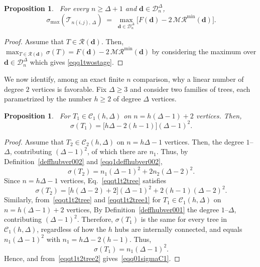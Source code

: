 \documentclass[12pt]{amsart}
\newtheorem{proposition}[theorem]{Proposition}
\newcommand{\TT}{\mathcal{T}}
\newcommand{\RR}{\mathcal{MR}}
\begin{document}
\begin{proposition}~\label{prop01decomposition}
For every $n\geqslant \Delta+1$ and $\mathbf d\in\mathcal D_n^\Delta$,
\begin{equation}~\label{eqq1twostage}
\sigma_{\max}(\TT_{n(i,j),\,\Delta}) \;=\; \max_{\mathbf d\in\mathcal D_n^\Delta}
\Big[F(\mathbf d) - 2\,\RR^{\min}(\mathbf d)\Big].
\end{equation}
\end{proposition}
\begin{proof}
Assume that $T\in\mathcal R(\mathbf d)$. Then, 
$\max_{T\in\mathcal R(\mathbf d)}\sigma(T) = F(\mathbf d) - 2\, \RR^{\min}(\mathbf d)$ by considering the maximum over $\mathbf d\in\mathcal D_n^\Delta$ which gives \eqref{eqq1twostage}.
\end{proof}

We now identify, among an exact finite $n$ comparison, why a linear number of
degree $2$ vertices is favorable. Fix $\Delta\geqslant 3$ and consider two families
of trees, each parametrized by the number $h\geqslant 2$ of degree $\Delta$ 
vertices.



\begin{proposition}~\label{prop001C1sigma}
For $T_1\in\mathcal C_1(h,\Delta)$ on $n=h(\Delta-1)+2$ vertices. Then, 
\begin{equation}~\label{eqq01sigmaC1}
\sigma(T_1)=\big[h\Delta-2(h-1)\big](\Delta-1)^2.
\end{equation}
\end{proposition}
\begin{proof}
Assume that $T_2\in\mathcal C_2(h,\Delta)$ on $n=h\Delta-1$ vertices. Then, the degree $1$–$\Delta$, contributing $(\Delta-1)^2$, of which there are $n_1$.  Thus, by Definition~\ref{deffhubver002} and \eqref{eqq1deffhubver002}, 
\begin{equation}~\label{eqqt1t2tree}
\sigma(T_2)=n_1(\Delta-1)^2 + 2n_2(\Delta-2)^2.
\end{equation}
Since $n=h\Delta-1$ vertices, Eq.~\eqref{eqqt1t2tree} satisfies
\begin{equation}~\label{eqqt1t2tree1}
 \sigma(T_2)= \big[h(\Delta-2)+2\big](\Delta-1)^2 + 2(h-1)(\Delta-2)^2.  
\end{equation}
Similarly, from~\eqref{eqqt1t2tree} and \eqref{eqqt1t2tree1} for $T_1\in\mathcal C_1(h,\Delta)$ on $n=h(\Delta-1)+2$ vertices, By Definition~\ref{deffhubver001} the degree $1$–$\Delta$, contributing
$(\Delta-1)^2$. Therefore, $\sigma(T_1)$ is the same for  every tree
in $\mathcal C_1(h,\Delta)$, regardless of how the $h$ hubs are internally
connected, and equals $n_1(\Delta-1)^2$ with $n_1=h\Delta-2(h-1)$. Thus, 
\begin{equation}~\label{eqqt1t2tree2}
\sigma(T_1)=n_1(\Delta-1)^2.  
\end{equation}
Hence,  and from~\eqref{eqqt1t2tree2}  gives~\eqref{eqq01sigmaC1}.
\end{proof}
\end{document}
